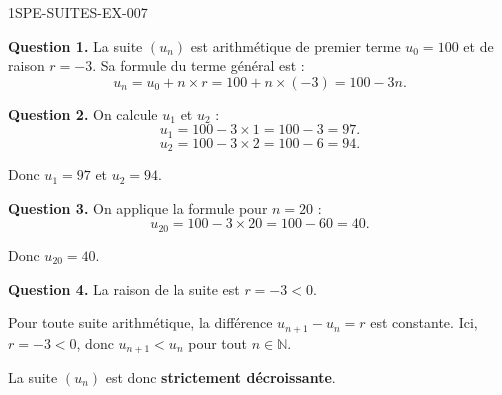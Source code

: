 \begin{corrige}{1SPE-SUITES-EX-007}


\textbf{Question 1.} La suite $(u_n)$ est arithmétique de premier terme $u_0 = 100$ et de raison $r = -3$. Sa formule du terme général est :
\[
u_n = u_0 + n \times r = 100 + n \times (-3) = 100 - 3n.
\]


\textbf{Question 2.} On calcule $u_1$ et $u_2$ :
\[
u_1 = 100 - 3 \times 1 = 100 - 3 = 97.
\]
\[
u_2 = 100 - 3 \times 2 = 100 - 6 = 94.
\]

Donc $u_1 = 97$ et $u_2 = 94$.

\textbf{Question 3.} On applique la formule pour $n = 20$ :
\[
u_{20} = 100 - 3 \times 20 = 100 - 60 = 40.
\]

Donc $u_{20} = 40$.


\textbf{Question 4.} La raison de la suite est $r = -3 < 0$.

Pour toute suite arithmétique, la différence $u_{n+1} - u_n = r$ est constante. Ici, $r = -3 < 0$, donc $u_{n+1} < u_n$ pour tout $n \in \mathbb{N}$.

La suite $(u_n)$ est donc \textbf{strictement décroissante}.

\end{corrige}
